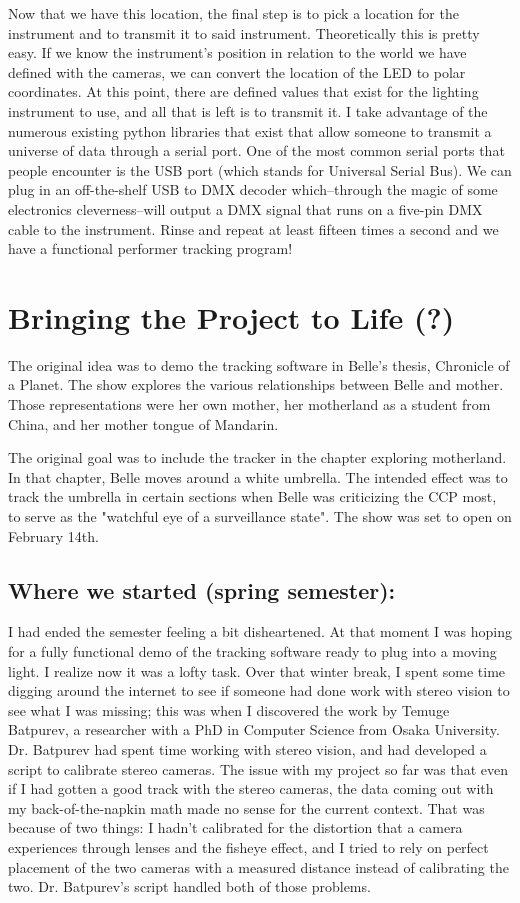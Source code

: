 \documentclass[12pt,twoside]{reedthesis}
\begin{document}
Now that we have this location, the final step is to pick a location for the instrument and to transmit it to said instrument. Theoretically this is pretty easy. If we know the instrument's position in relation to the world we have defined with the cameras, we can convert the location of the LED to polar coordinates. At this point, there are defined values that exist for the lighting instrument to use, and all that is left is to transmit it. I take advantage of the numerous existing python libraries that exist that allow someone to transmit a universe of data through a serial port. One of the most common serial ports that people encounter is the USB port (which stands for Universal Serial Bus). We can plug in an off-the-shelf USB to DMX decoder which–through the magic of some electronics cleverness–will output a DMX signal that runs on a five-pin DMX cable to the instrument. Rinse and repeat at least fifteen times a second and we have a functional performer tracking program!

\chapter{Bringing the Project to Life (?)}
The original idea was to demo the tracking software in Belle's thesis, Chronicle of a Planet. The show explores the various relationships between Belle and mother. Those representations were her own mother, her motherland as a student from China, and her mother tongue of Mandarin.

The original goal was to include the tracker in the chapter exploring motherland. In that chapter, Belle moves around a white umbrella. The intended effect was to track the umbrella in certain sections when Belle was criticizing the CCP most, to serve as the "watchful eye of a surveillance state". The show was set to open on February 14th.

\section{Where we started (spring semester):}

I had ended the semester feeling a bit disheartened. At that moment I was hoping for a fully functional demo of the tracking software ready to plug into a moving light. I realize now it was a lofty task. Over that winter break, I spent some time digging around the internet to see if someone had done work with stereo vision to see what I was missing; this was when I discovered the work by Temuge Batpurev, a researcher with a PhD in Computer Science from Osaka University. Dr. Batpurev had spent time working with stereo vision, and had developed a script to calibrate stereo cameras. The issue with my project so far was that even if I had gotten a good track with the stereo cameras, the data coming out with my back-of-the-napkin math made no sense for the current context. That was because of two things: I hadn't calibrated for the distortion that a camera experiences through lenses and the fisheye effect, and I tried to rely on perfect placement of the two cameras with a measured distance instead of calibrating the two. Dr. Batpurev's script handled both of those problems.
\end{document}
